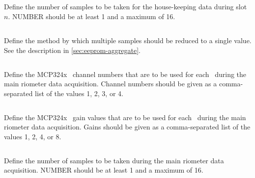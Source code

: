 
\subsection[rio-housekeeping-n-num-samples]{}

Define the number of samples to be taken for the house-keeping data
during slot $n$. NUMBER should be at least 1 and a maximum of 16.


\subsection[rio-housekeeping-n-aggregate]{}

Define the method by which multiple samples should be reduced to a
single value. See the description in \ref{sec:eeprom-aggregate}.

\subsection[rio-riometer-adc-channel-list]{}

Define the MCP324x \adc\ channel numbers that are to be used for each
\adc\ during the main riometer data acquisition. Channel numbers
should be given as a comma-separated list of the values 1, 2, 3, or 4.

\subsection[rio-riometer-adc-gain-list]{}

Define the MCP324x \adc\ gain values that are to be used for each
\adc\ during the main riometer data acquisition. Gains should be given
as a comma-separated list of the values 1, 2, 4, or 8.

\subsection[rio-riometer-num-samples]{}

Define the number of samples to be taken during the main riometer data
acquisition. NUMBER should be at least 1 and a maximum of 16.

\subsection[rio-riometer-aggregate]{}

